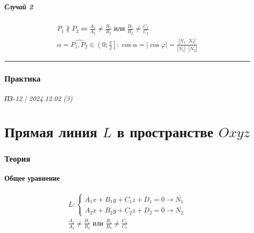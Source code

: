 \documentclass{article}
\begin{document}
\subsubsection{Случай 2}
\begin{gather*}
    \boxed{P_1 \nparallel P_2} \Leftrightarrow 
    \frac{A_1}{A_2} \neq \frac{B_1}{B_2} \text{ или } \frac{B_1}{B_2} \neq \frac{C_1}{C_2} \\
    \alpha = \widehat{P_1, P_2} \in \left( 0; \frac{\pi}{2} \right]:
    \cos \alpha = |\cos \varphi| = \frac{| \overline{N_1} \cdot \overline{N_2} |}{| \overline{N_1} | \cdot | \overline{N_2} |}
\end{gather*}



\par\noindent\rule{\textwidth}{2pt}
\section{Практика}

\subsection{}


\newpage
\paragraph{ПЗ-12 | 2024.12.02 (3)}
\part{Прямая линия $L$ в пространстве $Oxyz$}

\section{Теория}

\subsection{Общее уравнение}
\begin{gather*}
    L:
    \begin{cases}
        A_1x + B_1y + C_1z + D_1 = 0 \rightarrow \overline{N_1} \\
        A_2x + B_2y + C_2z + D_2 = 0 \rightarrow \overline{N_2}
    \end{cases} \\
    \frac{A_1}{A_2} \neq \frac{B_1}{B_2} \text{ или } \frac{B_1}{B_2} \neq \frac{C_1}{C_2} \\
\end{gather*}
\end{document}
